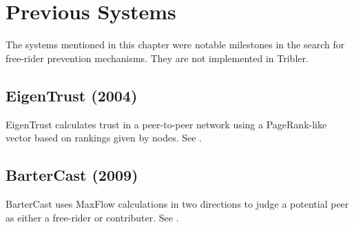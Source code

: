 \chapter{Previous Systems}
The systems mentioned in this chapter were notable milestones in the search for free-rider prevention mechanisms. They are not implemented in Tribler.

\section{EigenTrust (2004)}
EigenTrust calculates trust in a peer-to-peer network using a PageRank-like vector based on rankings given by nodes. See \cite{kamvar2003eigentrust}.

\section{BarterCast (2009)}
BarterCast uses MaxFlow calculations in two directions to judge a potential peer as either a free-rider or contributer. See \cite{meulpolder2009bartercast}.
